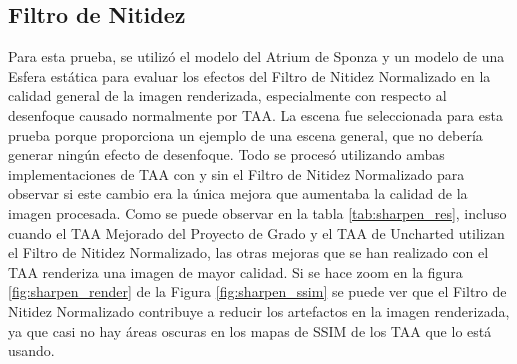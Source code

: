 \documentclass[pregrado]{tesis-usb} %
\begin{document}
\subsection{Filtro de Nitidez}
Para esta prueba, se utilizó el modelo del Atrium de Sponza y un modelo de una Esfera estática para evaluar los efectos del Filtro de Nitidez Normalizado en la calidad general de la imagen renderizada, especialmente con respecto al desenfoque causado normalmente por TAA. La escena fue seleccionada para esta prueba porque proporciona un ejemplo de una escena general, que no debería generar ningún efecto de desenfoque. Todo se procesó utilizando ambas implementaciones de TAA con y sin el Filtro de Nitidez Normalizado para observar si este cambio era la única mejora que aumentaba la calidad de la imagen procesada. Como se puede observar en la tabla \ref{tab:sharpen_res}, incluso cuando el TAA Mejorado del Proyecto de Grado y el TAA de Uncharted utilizan el Filtro de Nitidez Normalizado, las otras mejoras que se han realizado  con el TAA renderiza una imagen de mayor calidad. Si se hace zoom en la figura \ref{fig:sharpen_render} de la Figura \ref{fig:sharpen_ssim} se puede ver que el Filtro de Nitidez Normalizado contribuye a reducir los artefactos en la imagen renderizada, ya que casi no hay áreas oscuras en los mapas de SSIM de los TAA que lo está usando.
\end{document}
